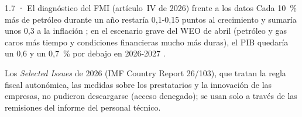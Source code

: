 \begin{complemento}{1.7 · El diagnóstico del FMI (artículo~IV de 2026) frente a los datos}
 Cada 10~\% más de petróleo durante un año restaría 0,1-0,15 puntos al crecimiento y sumaría unos 0,3 a la inflación ; en el escenario grave del WEO de abril (petróleo y gas caros más tiempo y condiciones financieras mucho más duras), el PIB quedaría un 0,6 y un 0,7~\% por debajo en 2026-2027 .

 Los \emph{Selected Issues} de 2026 (IMF Country Report 26/103), que tratan la regla fiscal autonómica, las medidas sobre los prestatarios y la innovación de las empresas, no pudieron descargarse (acceso denegado); se usan solo a través de las remisiones del informe del personal técnico.
\end{complemento}
